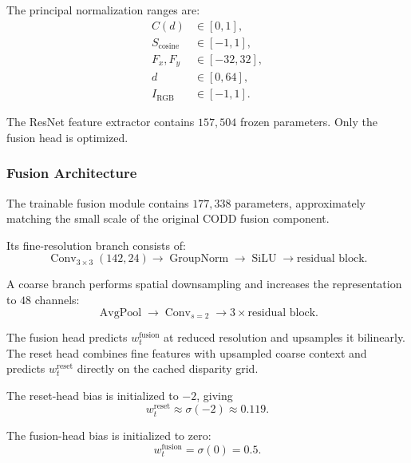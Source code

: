 \documentclass[11pt,a4paper]{article}
\begin{document}
The principal normalization ranges are:
\begin{align}
    C(d) &\in [0,1],\\
    S_{\mathrm{cosine}} &\in [-1,1],\\
    F_x,F_y &\in [-32,32],\\
    d &\in [0,64],\\
    I_{\mathrm{RGB}} &\in [-1,1].
\end{align}

The ResNet feature extractor contains \(157{,}504\) frozen parameters. Only the fusion
head is optimized.

\subsubsection{Fusion Architecture}

The trainable fusion module contains \(177{,}338\) parameters, approximately matching the
small scale of the original CODD fusion component.

Its fine-resolution branch consists of:
\begin{equation}
    \operatorname{Conv}_{3\times3}(142,24)
    \rightarrow
    \operatorname{GroupNorm}
    \rightarrow
    \operatorname{SiLU}
    \rightarrow
    \text{residual block}.
\end{equation}

A coarse branch performs spatial downsampling and increases the representation to
\(48\) channels:
\begin{equation}
    \operatorname{AvgPool}
    \rightarrow
    \operatorname{Conv}_{s=2}
    \rightarrow
    3\times\text{residual block}.
\end{equation}

The fusion head predicts \(w_t^{\mathrm{fusion}}\) at reduced resolution and upsamples it
bilinearly. The reset head combines fine features with upsampled coarse context and predicts
\(w_t^{\mathrm{reset}}\) directly on the cached disparity grid.

The reset-head bias is initialized to \(-2\), giving
\begin{equation}
    w_t^{\mathrm{reset}}
    \approx
    \sigma(-2)
    \approx
    0.119.
\end{equation}

The fusion-head bias is initialized to zero:
\begin{equation}
    w_t^{\mathrm{fusion}}
    =
    \sigma(0)
    =
    0.5.
\end{equation}
\end{document}
